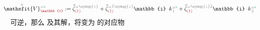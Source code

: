 \begin{align} \label{eq:plane_wave_basis-V1}
	\Xint{\mathcolor{gray}{-}}{25}{\bar{\bar{\mathsfit{V}}}}^{\;\! \mathcolor{gray}{\omega} \textcolor{ForestGreen}{\imath}}_{\textcolor{Maroon}{\mathbb{1}}} := \bar{\bar{\zeta}}^{\;\! \mathcolor{gray}{\omega} \mathcolor{gray}{\symup{z}}}_{\textcolor{Maroon}{(1)}} + \bar{\bar{\zeta}}^{\;\! \mathcolor{gray}{\omega} \mathcolor{gray}{\check{1} \symup{z}}}_{\textcolor{Maroon}{(1)}} \mathbb{i} \Xint{\begin{smallmatrix} ~ \\ {}^{}_{\mathcolor{gray}{-}} \\ ~ \end{smallmatrix}}{15}{k}_{\;\! \mathcolor{gray}{\check{1}}}^{\;\! \mathcolor{gray}{\omega} \textcolor{ForestGreen}{\imath}} + \bar{\bar{\zeta}}^{\;\! \mathcolor{gray}{\omega} \mathcolor{gray}{\symup{z} \check{2}}}_{\textcolor{Maroon}{(1)}} \mathbb{i} \Xint{\begin{smallmatrix} ~ \\ {}^{}_{\mathcolor{gray}{-}} \\ ~ \end{smallmatrix}}{15}{k}_{\;\! \mathcolor{gray}{\check{2}}}^{\;\! \mathcolor{gray}{\omega} \textcolor{ForestGreen}{\imath}}
\end{align}
可逆，那么  及其解，将变为  的对应物
